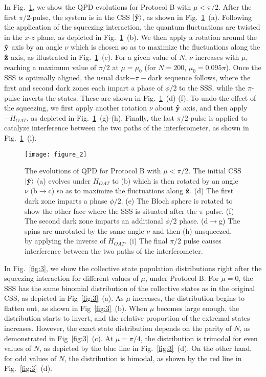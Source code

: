 \documentclass[aps,pra,letterpaper,superscriptaddress,showpacs,amsmath,floats,twocolumn]{revtex4-1}
\begin{document}
In Fig.~\ref{fig:2}, we show the QPD evolutions for Protocol B with $\mu< \pi/2$. After the first $\pi/2$-pulse, the system is in the CSS $\ket{\vu{y}}$, as shown in Fig.~\ref{fig:2}~(a). Following the application of the squeezing interaction, the quantum fluctuations are twisted in the $x$-$z$ plane, as depicted in Fig.~\ref{fig:2}~(b). We then apply a rotation around the $\vu{y}$ axis by an angle $\nu$ which is chosen so as to maximize the fluctuations along the $\vu{z}$ axis, as illustrated in Fig.~\ref{fig:2}~(c). For a given value of $N$, $\nu$ increases with $\mu$, reaching a maximum value of $\pi/2$ at $\mu=\mu_0$ (for $N=200$, $\mu_0=0.095\pi$). Once the SSS is optimally aligned, the usual dark$-\pi-$dark sequence follows, where the first and second dark zones each impart a phase of $\phi/2$ to the SSS, while the $\pi$-pulse inverts the states. These are shown in Fig.~\ref{fig:2}~(d)-(f). To undo the effect of the squeezing, we first apply another rotation $\nu$ about $\vu{y}$ axis, and then apply $-H_{OAT}$, as depicted in Fig.~\ref{fig:2}~(g)-(h). Finally, the last $\pi/2$ pulse is applied to catalyze interference between the two paths of the interferometer, as shown in Fig.~\ref{fig:2}~(i).

\begin{figure}[h]
\texttt{[image: figure\_2]}
\caption{The evolutions of QPD for Protocol B with $\mu<\pi/2$. The initial CSS $\ket{\vu{y}}$ (a) evolves under $H_{OAT}$ to (b) which is then rotated by an angle $\nu$ (b$\rightarrow$c) so as to maximize the fluctuations along $\vu{z}$. (d) The first dark zone imparts a phase $\phi/2$. (e) The Bloch sphere is rotated to show the other face where the SSS is situated after the $\pi$ pulse. (f) The second dark zone imparts an additional $\phi/2$ phase. (d$\rightarrow$g) The spins are unrotated by the same angle $\nu$ and then (h) unsqueezed, by applying the inverse of $H_{OAT}$. (i) The final $\pi/2$ pulse causes interference between the two paths of the interferometer.}
\label{fig:2}
\end{figure}
%

In Fig.~\ref{fig:3}, we show the collective state population distributions right after the squeezing interaction for different values of $\mu$, under Protocol B. For $\mu=0$, the SSS has the same binomial distribution of the collective states as in the original CSS, as depicted in Fig~\ref{fig:3}~(a). As $\mu$ increases, the distribution begins to flatten out, as shown in Fig~\ref{fig:3}~(b). When $\mu$ becomes large enough, the distribution starts to invert, and the relative proportion of the extremal states increases. However, the exact state distribution depends on the parity of $N$, as demonstrated in Fig~\ref{fig:3}~(c). At $\mu=\pi/4$, the distribution is trimodal for even values of $N$, as depicted by the blue line in Fig.~\ref{fig:3}~(d). On the other hand, for odd values of $N$, the distribution is bimodal, as shown by the red line in Fig.~\ref{fig:3}~(d).
\end{document}
